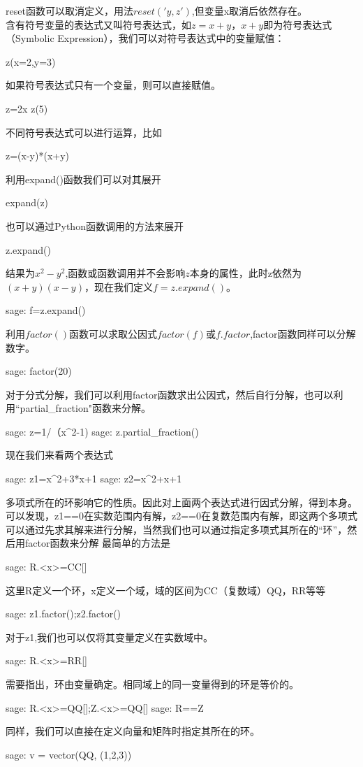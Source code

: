 \documentclass[a4paper]{article}
\begin{document}
\begin{multicols}{2}
reset函数可以取消定义，用法$reset('y,z')$,但变量x取消后依然存在。 \\
含有符号变量的表达式又叫符号表达式，如$z=x+y$，$x+y$即为符号表达式（Symbolic Expression），我们可以对符号表达式中的变量赋值：
\begin{sageblock}
z(x=2,y=3)
\end{sageblock}
如果符号表达式只有一个变量，则可以直接赋值。
\begin{sageblock}
z=2x
z(5)
\end{sageblock}

不同符号表达式可以进行运算，比如
\begin{sageblock}
z=(x-y)*(x+y)
\end{sageblock}

利用expand()函数我们可以对其展开
\begin{sageblock}
expand(z)
\end{sageblock}

也可以通过Python函数调用的方法来展开
\begin{sageblock}
z.expand()
\end{sageblock}

结果为$x^2-y^2$,函数或函数调用并不会影响$ z $本身的属性，此时z依然为$(x+y)(x-y)$，现在我们定义$f=z.expand()$。
\begin{sageblock}
	sage: f=z.expand()
\end{sageblock}
利用$factor()$函数可以求取公因式$factor(f)$或$f.factor$,factor函数同样可以分解数字。
\begin{sageblock}
	sage: factor(20)
\end{sageblock}

对于分式分解，我们可以利用factor函数求出公因式，然后自行分解，也可以利用``partial\_fraction"函数来分解。
\begin{sageblock}
	sage: z=1/（x^2-1)
	sage: z.partial_fraction()
\end{sageblock}
现在我们来看两个表达式
\begin{sageblock}
	sage: z1=x^2+3*x+1
	sage: z2=x^2+x+1
\end{sageblock}
多项式所在的环影响它的性质。因此对上面两个表达式进行因式分解，得到本身。可以发现，z1==0在实数范围内有解，z2==0在复数范围内有解，即这两个多项式可以通过先求其解来进行分解，当然我们也可以通过指定多项式其所在的“环”，然后用factor函数来分解 %
最简单的方法是
\begin{sageblock}
	sage: R.<x>=CC[]
\end{sageblock}
这里R定义一个环，x定义一个域，域的区间为CC（复数域）QQ，RR等等
\begin{sageblock}
	sage: z1.factor();z2.factor()
\end{sageblock}
对于z1,我们也可以仅将其变量定义在实数域中。
\begin{sageblock}
	sage: R.<x>=RR[]
\end{sageblock}
需要指出，环由变量确定。相同域上的同一变量得到的环是等价的。
\begin{sageblock}
	sage: R.<x>=QQ[];Z.<x>=QQ[]
	sage: R==Z
\end{sageblock}
同样，我们可以直接在定义向量和矩阵时指定其所在的环。
\begin{sageblock}
	sage: v = vector(QQ, (1,2,3))
\end{sageblock}  


\end{multicols}
\end{document}
